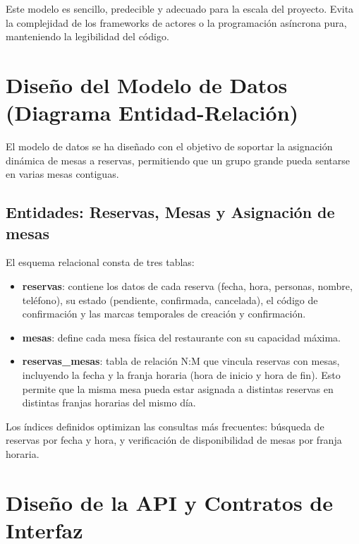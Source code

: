 Este modelo es sencillo, predecible y adecuado para la escala del proyecto. Evita la complejidad de los frameworks de actores o la programación asíncrona pura, manteniendo la legibilidad del código.


\section{Diseño del Modelo de Datos (Diagrama Entidad-Relación)}
\label{sec:modelo_datos}

El modelo de datos se ha diseñado con el objetivo de soportar la asignación dinámica de mesas a reservas, permitiendo que un grupo grande pueda sentarse en varias mesas contiguas.


\subsection{Entidades: Reservas, Mesas y Asignación de mesas}
\label{subsec:entidades_modelo}

El esquema relacional consta de tres tablas:

\begin{itemize}
    \item \textbf{reservas}: contiene los datos de cada reserva (fecha, hora, personas, nombre, teléfono), su estado (pendiente, confirmada, cancelada), el código de confirmación y las marcas temporales de creación y confirmación.
    \item \textbf{mesas}: define cada mesa física del restaurante con su capacidad máxima.
    \item \textbf{reservas\_mesas}: tabla de relación N:M que vincula reservas con mesas, incluyendo la fecha y la franja horaria (hora de inicio y hora de fin). Esto permite que la misma mesa pueda estar asignada a distintas reservas en distintas franjas horarias del mismo día.
\end{itemize}

Los índices definidos optimizan las consultas más frecuentes: búsqueda de reservas por fecha y hora, y verificación de disponibilidad de mesas por franja horaria.

\section{Diseño de la API y Contratos de Interfaz}
\label{sec:api_contratos}

